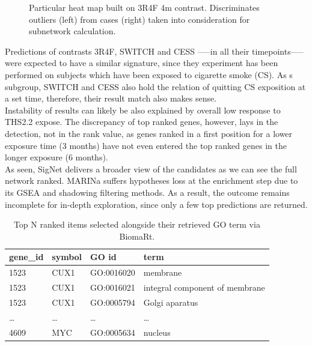 \begin{figure}
    \caption{Particular heat map built on 3R4F 4m contrast. Discriminates outliers (left) from cases (right) taken into consideration for subnetwork calculation.}
    \label{fig:heatmap-overview}
\end{figure}

Predictions of contrasts 3R4F, SWITCH and CESS —--in all their timepoints—-- were expected to have a similar signature, since they experiment has been performed on subjects which have been exposed to cigarette smoke (CS). As s subgroup, SWITCH and CESS also hold the relation of quitting CS exposition at a set time, therefore, their result match also makes sense.
\\

Instability of results can likely be also explained by overall low response to THS2.2 expose. The discrepancy of top ranked genes, however, lays in the detection, not in the rank value, as genes ranked in a first position for a lower exposure time (3 months) have not even entered the top ranked genes in the longer exposure (6 months).
\\

As seen, SigNet delivers a broader view of the candidates as we can see the full network ranked. MARINa suffers hypotheses loss at the enrichment step due to its GSEA and shadowing filtering methods. As a result, the outcome remains incomplete for in-depth exploration, since only a few top predictions are returned.
\\

\begin{table}[h]
\centering
\begin{tabular}{|l|l|l|l|}
\hline
gene\_id & symbol & GO id      & term                           \\ \hline
1523     & CUX1   & GO:0016020 & membrane                       \\ \hline
1523     & CUX1   & GO:0016021 & integral component of membrane \\ \hline
1523     & CUX1   & GO:0005794 & Golgi aparatus                 \\ \hline
…        & …      & …          & …                              \\ \hline
4609     & MYC    & GO:0005634 & nucleus                        \\ \hline
\end{tabular}
\caption{Top N ranked items selected alongside their retrieved GO term via BiomaRt.}
\label{tbl:goterms}
\end{table}


